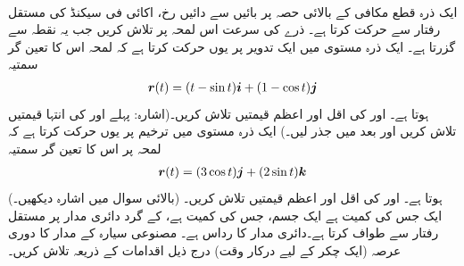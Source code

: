 \\
ایک ذرہ قطع مکافی  کے بالائی حصہ پر بائیں سے دائیں رخ،  اکائی فی سیکنڈ کی   مستقل رفتار   سے  حرکت کرتا ہے۔ ذرے کی سرعت اس لمحہ  پر تلاش کریں جب یہ نقطہ  سے گزرتا ہے۔
ایک ذرہ  مستوی  میں ایک  تدویر پر یوں حرکت کرتا ہے کہ لمحہ  اس کا تعین گر سمتیہ 
\begin{align*}
{\ensuremath{{\boldsymbol{r}}}}(t)=(t-\sin t){\boldsymbol{i}}+(1-\cos t){\boldsymbol{j}}
\end{align*}
ہوتا ہے۔  اور  کی اقل اور اعظم قیمتیں تلاش کریں۔(اشارہ: پہلے  اور  کی انتہا قیمتیں تلاش کریں اور بعد میں جذر لیں۔)
ایک ذرہ  مستوی  میں ترخیم  پر یوں  حرکت  کرتا ہے کہ لمحہ  پر اس کا  تعین گر سمتیہ 
\begin{align*}
{\ensuremath{{\boldsymbol{r}}}}(t)=(3\cos t){\boldsymbol{j}}+(2\sin t){\boldsymbol{k}}
\end{align*}
ہوتا ہے۔  اور  کی اقل  اور اعظم قیمتیں تلاش کریں۔ (بالائی سوال میں اشارہ  دیکھیں۔)
\\
ایک جس کی کمیت  ہے ایک جسم،  جس کی کمیت  ہے،  کے گرد دائری مدار  پر  مستقل رفتار  سے  طواف کرتا ہے۔دائری مدار کا رداس  ہے۔  مصنوعی سیارہ کے مدار کا    دوری عرصہ   (ایک چکر کے لیے درکار وقت)   درج ذیل اقدامات کے ذریعہ تلاش کریں۔
